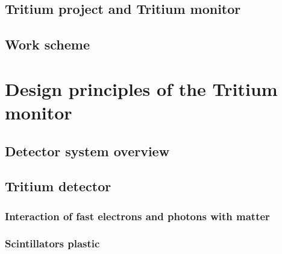 \documentclass[12pt,a4paper]{book}
\begin{document}
	\section{Tritium project and Tritium monitor}\label{sec:TritiumProject}
	
	\newpage
	
	\section{Work scheme}\label{sec:WorkScheme}
	\newpage	
	
\chapter[Design principles]{Design principles of the Tritium monitor}\label{chap:DesignPrinciples}
	\section{Detector system overview}\label{sec:MonitorOverview}
	 
	\newpage
	
	\section{Tritium detector}\label{sec:TritiumDectectorIntro}
	 
	\newpage
	
		\subsection[Interaction of particles with matter]{Interaction of fast electrons and photons with matter}\label{subsec:Interaction}
		 
					
		\subsection{Scintillators plastic} \label{subsec:PlasticScintillators}
		
		
			
\end{document}
